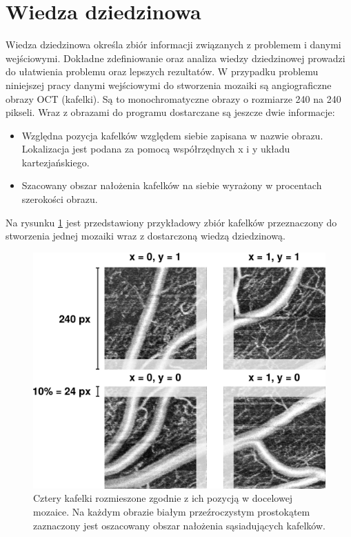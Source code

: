 \section{Wiedza dziedzinowa}
\label{sec:proponowane_algorytmy:wiedza_dziedzinowa}

Wiedza dziedzinowa określa zbiór informacji związanych z problemem i danymi wejściowymi. Dokładne zdefiniowanie oraz analiza wiedzy dziedzinowej prowadzi do ułatwienia problemu oraz lepszych rezultatów. W przypadku problemu niniejszej pracy danymi wejściowymi do stworzenia mozaiki są angiograficzne obrazy OCT (kafelki). Są to monochromatyczne obrazy o rozmiarze 240 na 240 pikseli. Wraz z obrazami do programu dostarczane są jeszcze dwie informacje:

\begin{itemize}
\item Względna pozycja kafelków względem siebie zapisana w nazwie obrazu. Lokalizacja jest podana za pomocą współrzędnych x i y układu kartezjańskiego.
\item Szacowany obszar nałożenia kafelków na siebie wyrażony w procentach szerokości obrazu.
\end{itemize}

Na rysunku \ref{fig:proponowane_algorytmy:example} jest przedstawiony przykładowy zbiór kafelków przeznaczony do stworzenia jednej mozaiki wraz z dostarczoną wiedzą dziedzinową.

\begin{figure}[H]
  \centering
  \includegraphics[width=\textwidth]{gfx/example}
  \caption{Cztery kafelki rozmieszone zgodnie z ich pozycją w docelowej mozaice. Na każdym obrazie białym przeźroczystym prostokątem zaznaczony jest oszacowany obszar nałożenia sąsiadujących kafelków.}
  \label{fig:proponowane_algorytmy:example}
\end{figure}

